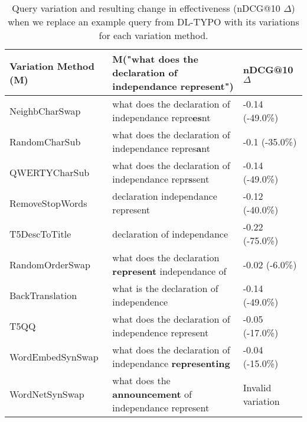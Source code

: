 \begin{table}[ht]
\centering
\caption{Query variation and resulting change in effectiveness (nDCG@10 $\Delta$)  when we replace an example query from DL-TYPO with its variations for each variation method.}
\label{tab:m-egs}
\begin{tabularx}{\columnwidth}{l|X|l}
\textbf{Variation Method (M)} & \textbf{M("what does the declaration of independance represent")} & \textbf{nDCG@10 $\Delta$} \\ \hline
NeighbCharSwap  & what does the declaration of independance repre\textbf{es}nt  & -0.14 (-49.0\%) \\
RandomCharSub   & what does the declaration of independance repres\textbf{a}nt  & -0.1 (-35.0\%)  \\
QWERTYCharSub   & what does the declaration of independance repr\textbf{s}sent  & -0.14 (-49.0\%) \\ \hline
RemoveStopWords & declaration independance represent                   & -0.12 (-40.0\%) \\
T5DescToTitle   & declaration of independance                          & -0.22 (-75.0\%) \\ \hline
RandomOrderSwap & what does the declaration \textbf{represent} independance of  & -0.02 (-6.0\%)  \\ \hline
BackTranslation & what is the declaration of independence              & -0.14 (-49.0\%) \\
T5QQ            & what does the declaration of independence represent  & -0.05 (-17.0\%) \\
WordEmbedSynSwap    & what does the declaration of independance \textbf{representing}            & -0.04 (-15.0\%)           \\
WordNetSynSwap  & what does the \textbf{announcement} of independance represent & Invalid variation \\ \hline
\end{tabularx}%
\end{table}

